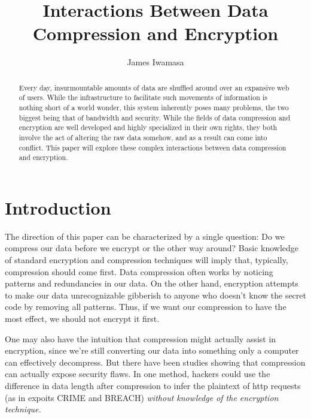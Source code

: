 \documentclass[11pt]{article}
\begin{document}
\title{Interactions Between Data Compression and Encryption}
\author{James Iwamasa}
\maketitle

\begin{abstract}
Every day, insurmountable amounts of data are shuffled around over an expansive web of users. 
While the infrastructure to facilitate such movements of information is nothing short of a world wonder, 
this system inherently poses many problems, the two biggest being that of bandwidth and security. 
While the fields of data compression and encryption are well developed and highly specialized in their 
own rights, they both involve the act of altering the raw data somehow, and as a result can come into 
conflict. This paper will explore these complex interactions between data compression and encryption.
\end{abstract}


\section{Introduction}\label{intro-sect}
The direction of this paper can be characterized by a single question: Do we compress our data before we 
encrypt or the other way around? Basic knowledge of standard encryption and compression techniques will 
imply that, typically, compression should come first. Data compression often works by noticing patterns and 
redundancies in our data. On the other hand, encryption attempts to make our data unrecognizable gibberish 
to anyone who doesn't know the secret code by removing all patterns. 
Thus, if we want our compression to have the most effect, we should not encrypt it first.

One may also have the intuition that compression might actually assist in encryption, 
since we're still converting our data into something only a computer can effectively decompress. 
But there have been studies\cite{kelsey, gluck} showing that compression can actually expose security flaws. 
In one method, hackers could use the difference in data length after compression to infer 
the plaintext of http requests (as in expoits CRIME and BREACH) \emph{without knowledge of the encryption technique.}
\end{document}
